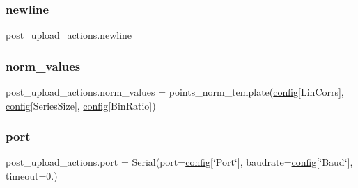 \mbox{\label{namespacepost__upload__actions_afb35f51de2003a038c02100770ee1ab9}} 
\subsubsection{\texorpdfstring{newline}{newline}}
{\footnotesize\ttfamily post\+\_\+upload\+\_\+actions.\+newline}

\mbox{\label{namespacepost__upload__actions_a8ce1efa4da6c671aad5bd74a05d6491a}} 
\subsubsection{\texorpdfstring{norm\+\_\+values}{norm\_values}}
{\footnotesize\ttfamily post\+\_\+upload\+\_\+actions.\+norm\+\_\+values = points\+\_\+norm\+\_\+template(\hyperlink{namespacepost__upload__actions_accb09cfbbad171dde59d37a322e7d426}{config}\mbox{[}\textquotesingle{}Lin\+Corrs\textquotesingle{}\mbox{]}, \hyperlink{namespacepost__upload__actions_accb09cfbbad171dde59d37a322e7d426}{config}\mbox{[}\textquotesingle{}Series\+Size\textquotesingle{}\mbox{]}, \hyperlink{namespacepost__upload__actions_accb09cfbbad171dde59d37a322e7d426}{config}\mbox{[}\textquotesingle{}Bin\+Ratio\textquotesingle{}\mbox{]})}

\mbox{\label{namespacepost__upload__actions_a93beac961ecb11f5cd375de68d537536}} 
\subsubsection{\texorpdfstring{port}{port}}
{\footnotesize\ttfamily post\+\_\+upload\+\_\+actions.\+port = Serial(port=\hyperlink{namespacepost__upload__actions_accb09cfbbad171dde59d37a322e7d426}{config}\mbox{[}\char`\"{}Port\char`\"{}\mbox{]}, baudrate=\hyperlink{namespacepost__upload__actions_accb09cfbbad171dde59d37a322e7d426}{config}\mbox{[}\char`\"{}Baud\char`\"{}\mbox{]}, timeout=0.)}

